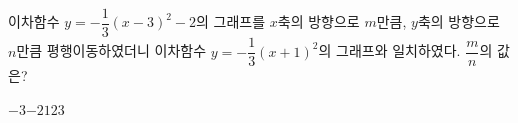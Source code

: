 이차함수 $y=-\dfrac{1}{3}(x-3)^2-2$의 그래프를 $x$축의 방향으로 $m$만큼, $y$축의 방향으로 $n$만큼 평행이동하였더니 이차함수 $y=-\dfrac{1}{3}(x+1)^2$의 그래프와 일치하였다. $\dfrac{m}{n}$의 값은?
\begin{choices32}{$-3$}{$-2$}{$1$}{$2$}{$3$}\end{choices32}
